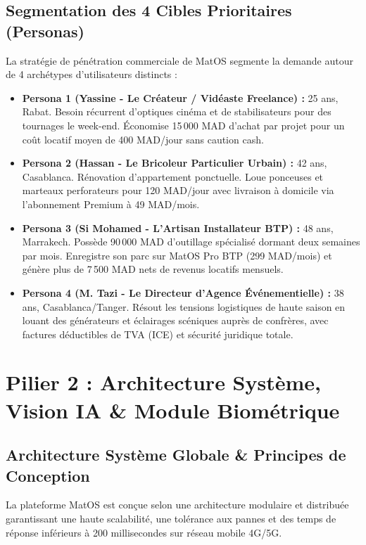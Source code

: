 \documentclass[11pt,a4paper]{report}
\begin{document}
\section{Segmentation des 4 Cibles Prioritaires (Personas)}
La stratégie de pénétration commerciale de MatOS segmente la demande autour de 4 archétypes d'utilisateurs distincts :
\begin{itemize}[leftmargin=*]
    \item \textbf{Persona 1 (Yassine - Le Créateur / Vidéaste Freelance) :} 25 ans, Rabat. Besoin récurrent d'optiques cinéma et de stabilisateurs pour des tournages le week-end. Économise 15\,000 MAD d'achat par projet pour un coût locatif moyen de 400 MAD/jour sans caution cash.
    \item \textbf{Persona 2 (Hassan - Le Bricoleur Particulier Urbain) :} 42 ans, Casablanca. Rénovation d'appartement ponctuelle. Loue ponceuses et marteaux perforateurs pour 120 MAD/jour avec livraison à domicile via l'abonnement Premium à 49 MAD/mois.
    \item \textbf{Persona 3 (Si Mohamed - L'Artisan Installateur BTP) :} 48 ans, Marrakech. Possède 90\,000 MAD d'outillage spécialisé dormant deux semaines par mois. Enregistre son parc sur MatOS Pro BTP (299 MAD/mois) et génère plus de 7\,500 MAD nets de revenus locatifs mensuels.
    \item \textbf{Persona 4 (M. Tazi - Le Directeur d'Agence Événementielle) :} 38 ans, Casablanca/Tanger. Résout les tensions logistiques de haute saison en louant des générateurs et éclairages scéniques auprès de confrères, avec factures déductibles de TVA (ICE) et sécurité juridique totale.
\end{itemize}

\chapter{Pilier 2 : Architecture Système, Vision IA \& Module Biométrique}

\section{Architecture Système Globale \& Principes de Conception}
La plateforme MatOS est conçue selon une architecture modulaire et distribuée garantissant une haute scalabilité, une tolérance aux pannes et des temps de réponse inférieurs à 200 millisecondes sur réseau mobile 4G/5G.
\end{document}
